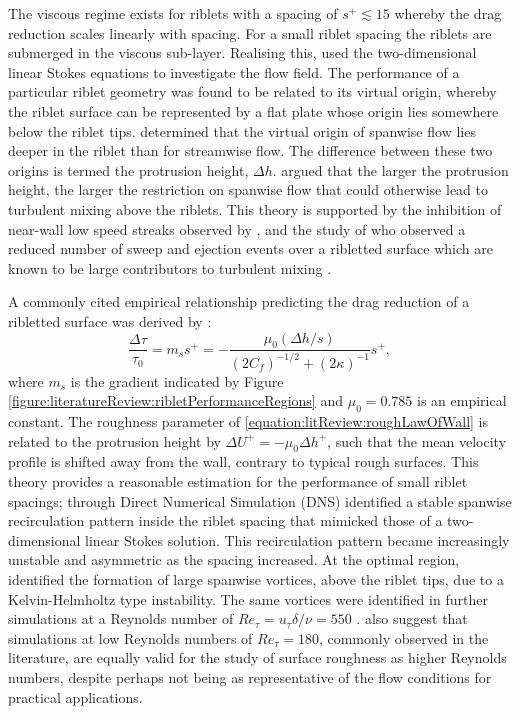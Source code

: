 \documentclass[12pt,oneside,a4paper]{article}
\begin{document}
%
The viscous regime exists for riblets with a spacing of $s^+  \lesssim 15$ whereby the drag reduction scales linearly with spacing. For a small riblet spacing the riblets are submerged in the viscous sub-layer. Realising this, \cite{luchini1991} used the two-dimensional linear Stokes equations to investigate the flow field. The performance of a particular riblet geometry was found to be related to its virtual origin, whereby the riblet surface can be represented by a flat plate whose origin lies somewhere below the riblet tips. \cite{luchini1991} determined that the virtual origin of spanwise flow lies deeper in the riblet than for streamwise flow. The difference between these two origins  is termed the protrusion height, $\Delta h$. \cite{luchini1991} argued that the larger the protrusion height, the larger the restriction on spanwise flow that could otherwise lead to turbulent mixing above the riblets. This theory is supported by the inhibition of near-wall low speed streaks observed by \cite{chu1993}, and the study of \cite{yang2016} who observed a reduced number of sweep and ejection events over a ribletted surface which are known to be large contributors to turbulent mixing \citep{pope2001}.

A commonly cited empirical relationship predicting the drag reduction of a ribletted surface was derived by \cite{bechert1997}:
\begin{equation}
\label{equation:literatureReview:ribletGradient}
\frac{\Delta \tau}{\tau_0} = m_s s^+ = - \frac{\mu_0 (\Delta h / s)}{(2 C_f)^{-1/2} + (2 \kappa)^{-1}}s^+,
\end{equation}
where $m_s$ is the gradient indicated by Figure \ref{figure:literatureReview:ribletPerformanceRegions} and $\mu_0 = 0.785$ is an empirical constant. The roughness parameter of 
\eqref{equation:litReview:roughLawOfWall} is related to the protrusion height by $\Delta U^+ = - \mu_0 \Delta h^+$, such that the mean velocity profile is shifted away from the wall, contrary to typical rough surfaces. This theory provides a reasonable estimation for the performance of small riblet spacings; through Direct Numerical Simulation (DNS) \cite{garcia2011a} identified a stable spanwise recirculation pattern inside the riblet spacing that mimicked those of a two-dimensional linear Stokes solution. This recirculation pattern became increasingly unstable and asymmetric as the spacing increased. At the optimal region, \cite{garcia2011a} identified the formation of large spanwise vortices, above the riblet tips, due to a Kelvin-Helmholtz type instability. The same vortices were identified in further simulations at a Reynolds number of $Re_\tau = u_\tau \delta / \nu = 550$ \citep{garcia2012}. \cite{garcia2012} also suggest that simulations at low Reynolds numbers of $Re_\tau = 180$, commonly observed in the literature, are equally valid for the study of surface roughness as higher Reynolds numbers, despite perhaps not being as representative of the flow conditions for practical applications. 
\end{document}
